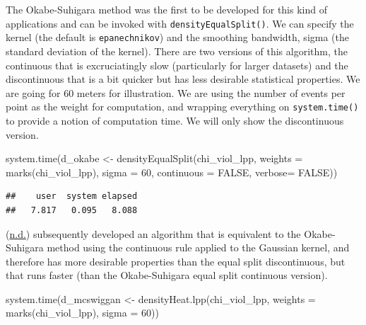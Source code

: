 \documentclass[
  krantz2]{krantz}
\makeatletter
\newenvironment{Shaded}{\begin{snugshade}}{\end{snugshade}}
\newcommand{\AttributeTok}[1]{\textcolor[rgb]{0.61,0.61,0.61}{#1}}
\newcommand{\ConstantTok}[1]{\textcolor[rgb]{0,0,0}{#1}}
\newcommand{\DecValTok}[1]{\textcolor[rgb]{0.06,0.06,0.06}{#1}}
\newcommand{\FunctionTok}[1]{\textcolor[rgb]{0,0,0}{#1}}
\newcommand{\NormalTok}[1]{#1}
\newcommand{\OtherTok}[1]{\textcolor[rgb]{0.37,0.37,0.37}{#1}}
\newenvironment{kframe}{%
\medskip{}
\setlength{\fboxsep}{.8em}
 \def\at@end@of@kframe{}%
 \ifinner\ifhmode%
  \def\at@end@of@kframe{\end{minipage}}%
  \begin{minipage}{\columnwidth}%
 \fi\fi%
 \def\FrameCommand##1{\hskip\@totalleftmargin \hskip-\fboxsep
 \colorbox{shadecolor}{##1}\hskip-\fboxsep
     \hskip-\linewidth \hskip-\@totalleftmargin \hskip\columnwidth}%
 \MakeFramed {\advance\hsize-\width
   \@totalleftmargin\z@ \linewidth\hsize
   \@setminipage}}%
 {\par\unskip\endMakeFramed%
 \at@end@of@kframe}
\renewenvironment{Shaded}{\begin{kframe}}{\end{kframe}}
\makeatother
\begin{document}
The Okabe-Suhigara method was the first to be developed for this kind of applications and can be invoked with \texttt{densityEqualSplit()}. We can specify the kernel (the default is \texttt{epanechnikov}) and the smoothing bandwidth, sigma (the standard deviation of the kernel). There are two versions of this algorithm, the continuous that is excruciatingly slow (particularly for larger datasets) and the discontinuous that is a bit quicker but has less desirable statistical properties. We are going for 60 meters for illustration. We are using the number of events per point as the weight for computation, and wrapping everything on \texttt{system.time()} to provide a notion of computation time. We will only show the discontinuous version.

\begin{Shaded}
\begin{Highlighting}[]
\FunctionTok{system.time}\NormalTok{(d\_okabe }\OtherTok{\textless{}{-}} \FunctionTok{densityEqualSplit}\NormalTok{(chi\_viol\_lpp, }
                                         \AttributeTok{weights =} \FunctionTok{marks}\NormalTok{(chi\_viol\_lpp), }
                                         \AttributeTok{sigma =} \DecValTok{60}\NormalTok{,}
                                         \AttributeTok{continuous =} \ConstantTok{FALSE}\NormalTok{,}
                                         \AttributeTok{verbose=} \ConstantTok{FALSE}\NormalTok{))}
\end{Highlighting}
\end{Shaded}

\begin{verbatim}
##    user  system elapsed 
##   7.817   0.095   8.088
\end{verbatim}

(\protect\hyperlink{ref-McSwiggan_2016}{n.d.}) subsequently developed an algorithm that is equivalent to the Okabe-Suhigara method using the continuous rule applied to the Gaussian kernel, and therefore has more desirable properties than the equal split discontinuous, but that runs faster (than the Okabe-Suhigara equal split continuous version).

\begin{Shaded}
\begin{Highlighting}[]
\FunctionTok{system.time}\NormalTok{(d\_mcswiggan }\OtherTok{\textless{}{-}} \FunctionTok{densityHeat.lpp}\NormalTok{(chi\_viol\_lpp, }
                                    \AttributeTok{weights =} \FunctionTok{marks}\NormalTok{(chi\_viol\_lpp), }
                                    \AttributeTok{sigma =} \DecValTok{60}\NormalTok{))}
\end{Highlighting}
\end{Shaded}
\end{document}
